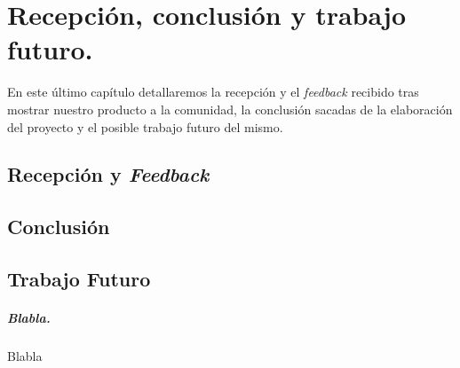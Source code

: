 \chapter{Recepción, conclusión y trabajo futuro.}

En este último capítulo detallaremos la recepción y el \textit{feedback} recibido tras mostrar nuestro producto a la comunidad, la conclusión sacadas de la elaboración del proyecto y el posible trabajo futuro del mismo.

\section{Recepción y \textit{Feedback}}

\section{Conclusión}

\section{Trabajo Futuro}

\paragraph{Blabla.} Blabla
